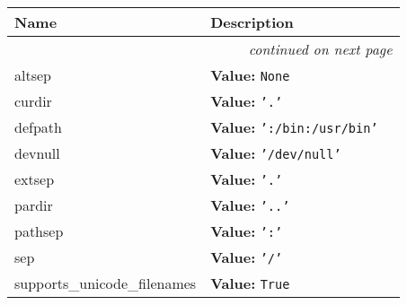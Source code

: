     \vspace{-1cm}
\hspace{\varindent}\begin{longtable}{|p{\varnamewidth}|p{\vardescrwidth}|l}
\cline{1-2}
\cline{1-2} \centering \textbf{Name} & \centering \textbf{Description}& \\
\cline{1-2}
\endhead\cline{1-2}\multicolumn{3}{r}{\small\textit{continued on next page}}\\\endfoot\cline{1-2}
\endlastfoot\raggedright a\-l\-t\-s\-e\-p\- & \raggedright \textbf{Value:} 
{\tt None}&\\
\cline{1-2}
\raggedright c\-u\-r\-d\-i\-r\- & \raggedright \textbf{Value:} 
{\tt \texttt{'}\texttt{.}\texttt{'}}&\\
\cline{1-2}
\raggedright d\-e\-f\-p\-a\-t\-h\- & \raggedright \textbf{Value:} 
{\tt \texttt{'}\texttt{:/bin:/usr/bin}\texttt{'}}&\\
\cline{1-2}
\raggedright d\-e\-v\-n\-u\-l\-l\- & \raggedright \textbf{Value:} 
{\tt \texttt{'}\texttt{/dev/null}\texttt{'}}&\\
\cline{1-2}
\raggedright e\-x\-t\-s\-e\-p\- & \raggedright \textbf{Value:} 
{\tt \texttt{'}\texttt{.}\texttt{'}}&\\
\cline{1-2}
\raggedright p\-a\-r\-d\-i\-r\- & \raggedright \textbf{Value:} 
{\tt \texttt{'}\texttt{..}\texttt{'}}&\\
\cline{1-2}
\raggedright p\-a\-t\-h\-s\-e\-p\- & \raggedright \textbf{Value:} 
{\tt \texttt{'}\texttt{:}\texttt{'}}&\\
\cline{1-2}
\raggedright s\-e\-p\- & \raggedright \textbf{Value:} 
{\tt \texttt{'}\texttt{/}\texttt{'}}&\\
\cline{1-2}
\raggedright s\-u\-p\-p\-o\-r\-t\-s\-\_\-u\-n\-i\-c\-o\-d\-e\-\_\-f\-i\-l\-e\-n\-a\-m\-e\-s\- & \raggedright \textbf{Value:} 
{\tt True}&\\
\cline{1-2}
\end{longtable}

